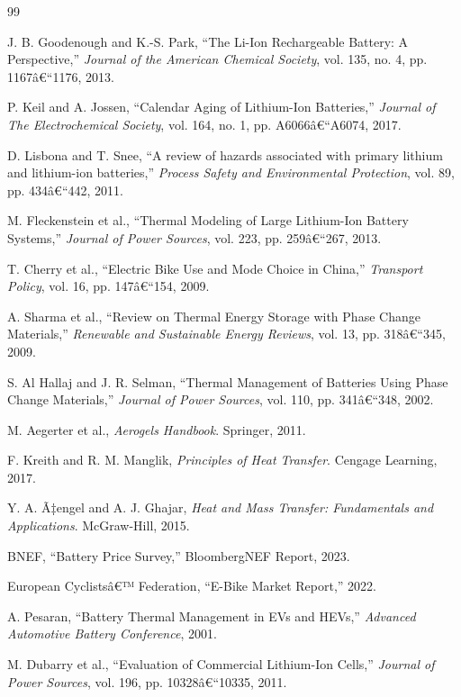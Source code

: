 ﻿\documentclass[a4paper,12pt]{article}
\theoremstyle{definition}
\begin{document}
\begin{thebibliography}{99}

J. B. Goodenough and K.-S. Park, ``The Li-Ion Rechargeable Battery: A Perspective,'' \textit{Journal of the American Chemical Society}, vol. 135, no. 4, pp. 1167â€“1176, 2013.

P. Keil and A. Jossen, ``Calendar Aging of Lithium-Ion Batteries,'' \textit{Journal of The Electrochemical Society}, vol. 164, no. 1, pp. A6066â€“A6074, 2017.

D. Lisbona and T. Snee, ``A review of hazards associated with primary lithium and lithium-ion batteries,'' \textit{Process Safety and Environmental Protection}, vol. 89, pp. 434â€“442, 2011.

M. Fleckenstein et al., ``Thermal Modeling of Large Lithium-Ion Battery Systems,'' \textit{Journal of Power Sources}, vol. 223, pp. 259â€“267, 2013.

T. Cherry et al., ``Electric Bike Use and Mode Choice in China,'' \textit{Transport Policy}, vol. 16, pp. 147â€“154, 2009.

A. Sharma et al., ``Review on Thermal Energy Storage with Phase Change Materials,'' \textit{Renewable and Sustainable Energy Reviews}, vol. 13, pp. 318â€“345, 2009.

S. Al Hallaj and J. R. Selman, ``Thermal Management of Batteries Using Phase Change Materials,'' \textit{Journal of Power Sources}, vol. 110, pp. 341â€“348, 2002.

M. Aegerter et al., \textit{Aerogels Handbook}. Springer, 2011.

F. Kreith and R. M. Manglik, \textit{Principles of Heat Transfer}. Cengage Learning, 2017.

Y. A. Ã‡engel and A. J. Ghajar, \textit{Heat and Mass Transfer: Fundamentals and Applications}. McGraw-Hill, 2015.

BNEF, ``Battery Price Survey,'' BloombergNEF Report, 2023.

European Cyclistsâ€™ Federation, ``E-Bike Market Report,'' 2022.

A. Pesaran, ``Battery Thermal Management in EVs and HEVs,'' \textit{Advanced Automotive Battery Conference}, 2001.

M. Dubarry et al., ``Evaluation of Commercial Lithium-Ion Cells,'' \textit{Journal of Power Sources}, vol. 196, pp. 10328â€“10335, 2011.


\end{thebibliography}
\end{document}
